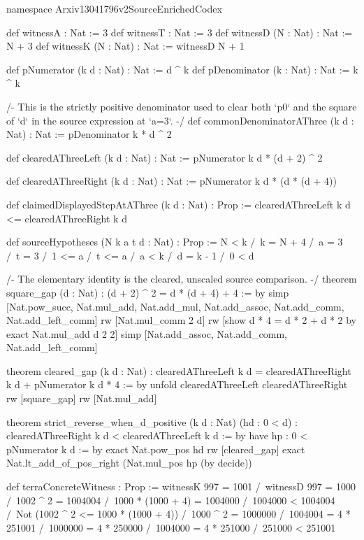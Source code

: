 \documentclass[11pt]{article}
\begin{document}
\begin{Vlean}
namespace Arxiv13041796v2SourceEnrichedCodex

def witnessA : Nat := 3
def witnessT : Nat := 3
def witnessD (N : Nat) : Nat := N + 3
def witnessK (N : Nat) : Nat := witnessD N + 1

def pNumerator (k d : Nat) : Nat := d ^ k
def pDenominator (k : Nat) : Nat := k ^ k

/- This is the strictly positive denominator used to clear both `p0` and the
square of `d` in the source expression at `a=3`. -/
def commonDenominatorAThree (k d : Nat) : Nat :=
  pDenominator k * d ^ 2

def clearedAThreeLeft (k d : Nat) : Nat :=
  pNumerator k d * (d + 2) ^ 2

def clearedAThreeRight (k d : Nat) : Nat :=
  pNumerator k d * (d * (d + 4))

def claimedDisplayedStepAtAThree (k d : Nat) : Prop :=
  clearedAThreeLeft k d <= clearedAThreeRight k d

def sourceHypotheses
    (N k a t d : Nat) : Prop :=
  N < k /\
  k = N + 4 /\
  a = 3 /\
  t = 3 /\
  1 <= a /\
  t <= a /\
  a < k /\
  d = k - 1 /\
  0 < d

/- The elementary identity is the cleared, unscaled source comparison. -/
theorem square_gap (d : Nat) :
    (d + 2) ^ 2 = d * (d + 4) + 4 := by
  simp [Nat.pow_succ, Nat.mul_add, Nat.add_mul, Nat.add_assoc,
    Nat.add_comm, Nat.add_left_comm]
  rw [Nat.mul_comm 2 d]
  rw [show d * 4 = d * 2 + d * 2 by
    exact Nat.mul_add d 2 2]
  simp [Nat.add_assoc, Nat.add_comm, Nat.add_left_comm]

theorem cleared_gap (k d : Nat) :
    clearedAThreeLeft k d =
      clearedAThreeRight k d + pNumerator k d * 4 := by
  unfold clearedAThreeLeft clearedAThreeRight
  rw [square_gap]
  rw [Nat.mul_add]

theorem strict_reverse_when_d_positive
    (k d : Nat) (hd : 0 < d) :
    clearedAThreeRight k d < clearedAThreeLeft k d := by
  have hp : 0 < pNumerator k d := by
    exact Nat.pow_pos hd
  rw [cleared_gap]
  exact Nat.lt_add_of_pos_right (Nat.mul_pos hp (by decide))

def terraConcreteWitness : Prop :=
  witnessK 997 = 1001 /\
  witnessD 997 = 1000 /\
  1002 ^ 2 = 1004004 /\
  1000 * (1000 + 4) = 1004000 /\
  1004000 < 1004004 /\
  Not (1002 ^ 2 <= 1000 * (1000 + 4)) /\
  1000 ^ 2 = 1000000 /\
  1004004 = 4 * 251001 /\
  1000000 = 4 * 250000 /\
  1004000 = 4 * 251000 /\
  251000 < 251001


\end{Vlean}
\end{document}
